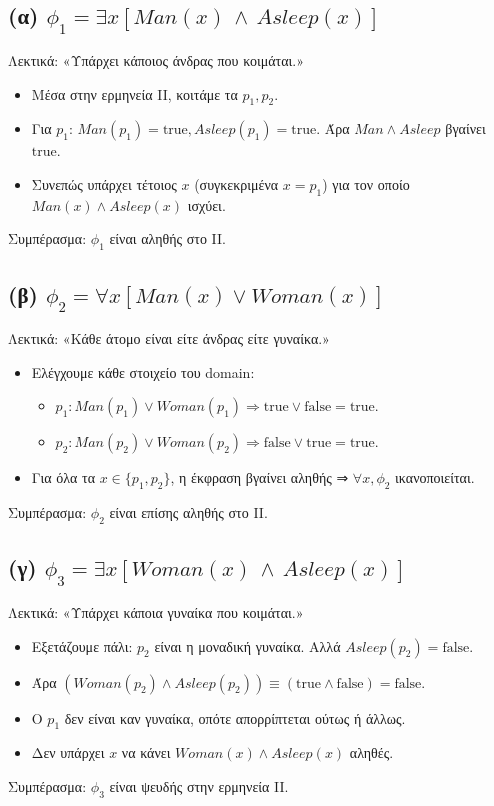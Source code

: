 \documentclass[a4paper,12pt]{article}
\begin{document}
\subsection*{(α) \(\phi_1 = \exists x [Man(x)\,\wedge\,Asleep(x)]\)}
Λεκτικά: «Υπάρχει κάποιος άνδρας που κοιμάται.»
\begin{itemize}
    \item Μέσα στην ερμηνεία II, κοιτάμε τα \(p_1, p_2\).
    \item Για \(p_1\): \(Man(p_1) = \text{true}, Asleep(p_1) = \text{true}\). Άρα \(Man \wedge Asleep\) βγαίνει \(\text{true}\).
    \item Συνεπώς υπάρχει τέτοιος \(x\) (συγκεκριμένα \(x = p_1\)) για τον οποίο \(Man(x) \wedge Asleep(x)\) ισχύει.
\end{itemize}
Συμπέρασμα: \(\phi_1\) είναι αληθής στο II.

\subsection*{(β) \(\phi_2 = \forall x [Man(x) \lor Woman(x)]\)}
Λεκτικά: «Κάθε άτομο είναι είτε άνδρας είτε γυναίκα.»
\begin{itemize}
    \item Ελέγχουμε κάθε στοιχείο του domain: 
    \begin{itemize}
        \item \(p_1: Man(p_1) \lor Woman(p_1) \Rightarrow \text{true} \lor \text{false} = \text{true}\).
        \item \(p_2: Man(p_2) \lor Woman(p_2) \Rightarrow \text{false} \lor \text{true} = \text{true}\).
    \end{itemize}
    \item Για όλα τα \(x \in \{p_1, p_2\}\), η έκφραση βγαίνει αληθής ⇒ \(\forall x, \phi_2\) ικανοποιείται.
\end{itemize}
Συμπέρασμα: \(\phi_2\) είναι επίσης αληθής στο II.

\subsection*{(γ) \(\phi_3 = \exists x [Woman(x) \,\wedge\, Asleep(x)]\)}
Λεκτικά: «Υπάρχει κάποια γυναίκα που κοιμάται.»
\begin{itemize}
    \item Εξετάζουμε πάλι: \(p_2\) είναι η μοναδική γυναίκα. Αλλά \(Asleep(p_2) = \text{false}\).
    \item Άρα \((Woman(p_2) \wedge Asleep(p_2)) \equiv (\text{true} \wedge \text{false}) = \text{false}\).
    \item Ο \(p_1\) δεν είναι καν γυναίκα, οπότε απορρίπτεται ούτως ή άλλως.
    \item Δεν υπάρχει \(x\) να κάνει \(Woman(x) \wedge Asleep(x)\) αληθές.
\end{itemize}
Συμπέρασμα: \(\phi_3\) είναι ψευδής στην ερμηνεία II.
\end{document}
